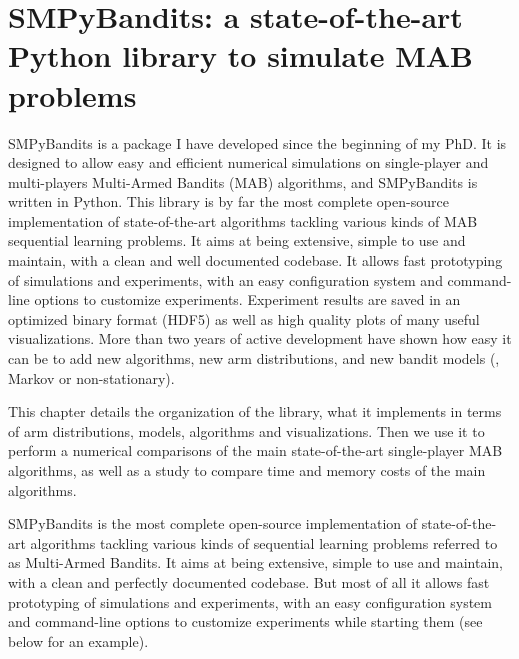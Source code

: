 
\chapter{SMPyBandits: a state-of-the-art Python library to simulate MAB problems}
\label{chapter:3}
\minitoc

SMPyBandits is a package I have developed since the beginning of my PhD.
It is designed to allow easy and efficient numerical simulations on single-player and multi-players Multi-Armed Bandits (MAB) algorithms, and SMPyBandits is written in Python.
This library is by far the most complete open-source implementation of state-of-the-art algorithms tackling various kinds of MAB sequential learning problems.
It aims at being extensive, simple to use and maintain, with a clean and well documented codebase.
It allows fast prototyping of simulations and experiments, with an easy configuration system and command-line options to customize experiments.
Experiment results are saved in an optimized binary format (HDF5) as well as high quality plots of many useful visualizations.
%
More than two years of active development have shown how easy it can be to add new algorithms, new arm distributions, and new bandit models (\eg, Markov or non-stationary).

This chapter details the organization of the library, what it implements in terms of arm distributions, models, algorithms and visualizations.
Then we use it to perform a numerical comparisons of the main state-of-the-art single-player MAB algorithms, as well as a study to compare time and memory costs of the main algorithms.

\graphicspath{{2-Chapters/3-Chapter/Images/}}
\graphicspath{{2-Chapters/3-Chapter/SMPyBandits_paper.git/plots/}}


SMPyBandits is the most complete open-source implementation of state-of-the-art algorithms tackling various kinds of sequential learning problems referred to as Multi-Armed Bandits.
It aims at being extensive, simple to use and maintain, with a clean and perfectly documented codebase. But most of all it allows fast prototyping of simulations and experiments, with an easy configuration system and command-line options to customize experiments while starting them (see below for an example).

